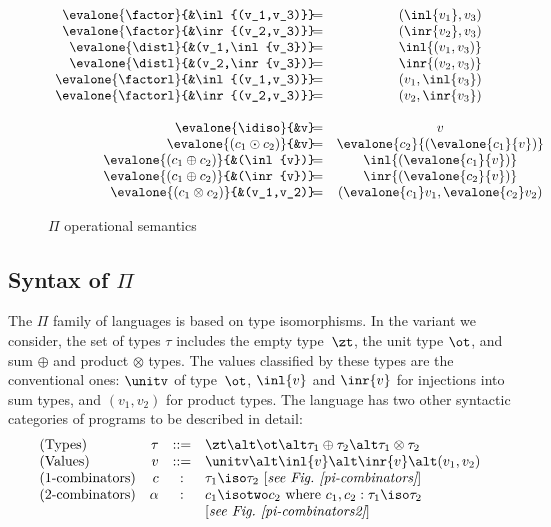 \begin{figure*}[ht]
\begin{multicols}{2}
\[\begin{array}{r@{\!}lcl}
\evalone{\factor}{&\inl{(v_1,v_3)}} &=& (\inl{v_1},v_3) \\
\evalone{\factor}{&\inr{(v_2,v_3)}} &=& (\inr{v_2},v_3) \\
\evalone{\distl}{&(v_1,\inl{v_3})} &=& \inl{(v_1,v_3)} \\
\evalone{\distl}{&(v_2,\inr{v_3})} &=& \inr{(v_2,v_3)} \\
\evalone{\factorl}{&\inl{(v_1,v_3)}} &=& (v_1,\inl{v_3}) \\
\evalone{\factorl}{&\inr{(v_2,v_3)}} &=& (v_2,\inr{v_3}) \\
\\
\evalone{\idiso}{&v} &=& v \\
\evalone{(c_1 \odot c_2)}{&v} &=& 
  \evalone{c_2}{(\evalone{c_1}{v})} \\
\evalone{(c_1 \oplus c_2)}{&(\inl{v})} &=& 
  \inl{(\evalone{c_1}{v})} \\
\evalone{(c_1 \oplus c_2)}{&(\inr{v})} &=& 
  \inr{(\evalone{c_2}{v})} \\
\evalone{(c_1 \otimes c_2)}{&(v_1,v_2)} &=& 
  (\evalone{c_1}v_1, \evalone{c_2}v_2) 
\end{array}\]
\end{multicols}
\caption{\label{opsem}$\Pi$ operational semantics}
\end{figure*}

\subsection{Syntax of $\Pi$}
\label{opsempi}

The $\Pi$ family of languages is based on type isomorphisms. In the
variant we consider, the set of types $\tau$ includes the empty
type~$\zt$, the unit type $\ot$, and sum $\oplus$ and product
$\otimes$ types. The values classified by these types are the
conventional ones: $\unitv$ of type~$\ot$, $\inl{v}$ and $\inr{v}$ for
injections into sum types, and $(v_1,v_2)$ for product types. The
language has two other syntactic categories of programs to be
described in detail:
\[\begin{array}{lrcl}
(\textrm{Types}) & 
  \tau &::=& \zt \alt \ot \alt \tau_1 \oplus \tau_2 \alt \tau_1 \otimes \tau_2 \\
(\textrm{Values}) & 
  v &::=& \unitv \alt \inl{v} \alt \inr{v} \alt (v_1,v_2) \\
(\textrm{1-combinators}) & 
  c &:& \tau_1 \iso \tau_2 ~ [\textit{see Fig.~\ref{pi-combinators}}] \\
(\textrm{2-combinators}) &
  \alpha &:& c_1 \isotwo c_2 \mbox{~where~} c_1, c_2 : \tau_1 \iso \tau_2 \\
  & && [\textit{see Fig.~\ref{pi-combinators2}}]
\end{array}\]

